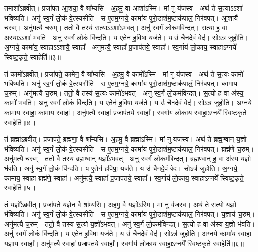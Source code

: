    तमाशा᳚ऽब्रवीत्।
   प्रजा॑पत आ॒शया॒ वै श्रा᳚म्यसि।
   अ॒हमु॒ वा आशा᳚ऽस्मि।
   मां नु य॑जस्व।
   अथ॑ ते स॒त्याऽऽशा॑ भविष्यति।
   अनु॑ स्व॒र्गं लो॒कं वे॒त्स्यसीति॑।
   स ए॒तम॒ग्नये॒ कामा॑य पुरो॒डाश॑म॒ष्टाक॑पालं॒ निर॑वपत्।
   आ॒शायै॑ च॒रुम्।
   अनु॑मत्यै च॒रुम्।
   ततो॒ वै तस्य॑ स॒त्याऽऽशा॑ऽभवत्।
   अनु॑ स्व॒र्गं लो॒कम॑विन्दत्।
   स॒त्या ह॒ वा अ॒स्याऽऽशा॑ भवति।
   अनु॑ स्व॒र्गं लो॒कं वि॑न्दति।
   य ए॒तेन॑ ह॒विषा॒ यज॑ते।
   य उ॑ चैनदे॒वं वेद॑।
   सोऽत्र॑ जुहोति।
   अ॒ग्नये॒ कामा॑य॒ स्वाहा॒ऽऽशायै॒ स्वाहा᳚।
   अनु॑मत्यै॒ स्वाहा᳚ प्र॒जाप॑तये॒ स्वाहा᳚।
   स्व॒र्गाय॑ लो॒काय॒ स्वाहा॒ऽग्नये᳚ स्विष्ट॒कृते॒ स्वाहेति॑॥३॥

   तं कामो᳚ऽब्रवीत्।
   प्रजा॑पते॒ कामे॑न॒ वै श्रा᳚म्यसि।
   अ॒हमु॒ वै कामो᳚ऽस्मि।
   मां नु य॑जस्व।
   अथ॑ ते स॒त्यः कामो॑ भविष्यति।
   अनु॑ स्व॒र्गं लो॒कं वे॒त्स्यसीति॑।
   स ए॒तम॒ग्नये॒ कामा॑य पुरो॒डाश॑म॒ष्टाक॑पालं॒ निर॑वपत्।
   कामा॑य च॒रुम्।
   अनु॑मत्यै च॒रुम्।
   ततो॒ वै तस्य॑ स॒त्यः कामो॑ऽभवत्।
   अनु॑ स्व॒र्गं लो॒कम॑विन्दत्।
   स॒त्यो ह॒ वा अ॑स्य॒ कामो॑ भवति।
   अनु॑ स्व॒र्गं लो॒कं वि॑न्दति।
   य ए॒तेन॑ ह॒विषा॒ यज॑ते।
   य उ॑ चैनदे॒वं वेद॑।
   सोऽत्र॑ जुहोति।
   अ॒ग्नये॒ कामा॑य॒ स्वाहा॒ कामा॑य॒ स्वाहा᳚।
   अनु॑मत्यै॒ स्वाहा᳚ प्र॒जाप॑तये॒ स्वाहा᳚।
   स्व॒र्गाय॑ लो॒काय॒ स्वाहा॒ऽग्नये᳚ स्विष्ट॒कृते॒ स्वाहेति॑॥४॥

   तं ब्रह्मा᳚ऽब्रवीत्।
   प्रजा॑पते॒ ब्रह्म॑णा॒ वै श्रा᳚म्यसि।
   अ॒हमु॒ वै ब्रह्मा᳚ऽस्मि।
   मां नु यज॑स्व।
   अथ॑ ते ब्रह्म॒ण्वान् य॒ज्ञो भ॑विष्यति।
   अनु॑ स्व॒र्गं लो॒कं वे॒त्स्यसीति॑।
   स ए॒तम॒ग्नये॒ कामा॑य पुरो॒डाश॑म॒ष्टाक॑पालं॒ निर॑वपत्।
   ब्रह्म॑णे च॒रुम्।
   अनु॑मत्यै च॒रुम्।
   ततो॒ वै तस्य॑ ब्रह्म॒ण्वान् य॒ज्ञो॑ऽभवत्।
   अनु॑ स्व॒र्गं लो॒कम॑विन्दत्।
   ब्र॒ह्म॒ण्वान् ह॒ वा अ॑स्य य॒ज्ञो भ॑वति।
   अनु॑ स्व॒र्गं लो॒कं वि॑न्दति।
   य ए॒तेन॑ ह॒विषा॒ यज॑ते।
   य उ॑ चैनदे॒वं वेद॑।
   सोऽत्र॑ जुहोति।
   अ॒ग्नये॒ कामा॑य॒ स्वाहा॒ ब्रह्म॑णे॒ स्वाहा᳚।
   अनु॑मत्यै॒ स्वाहा᳚ प्र॒जाप॑तये॒ स्वाहा᳚।
   स्व॒र्गाय॑ लो॒काय॒ स्वाहा॒ऽग्नये᳚ स्विष्ट॒कृते॒ स्वाहेति॑॥५॥

   तं य॒ज्ञो᳚ऽब्रवीत्।
   प्रजा॑पते य॒ज्ञेन॒ वै श्रा᳚म्यसि।
   अ॒हमु॒ वै य॒ज्ञो᳚ऽस्मि।
   मां नु य॑जस्व।
   अथ॑ ते स॒त्यो य॒ज्ञो भ॑विष्यति।
   अनु॑ स्व॒र्गं लो॒कं वे॒त्स्यसीति॑।
   स ए॒तम॒ग्नये॒ कामा॑य पुरो॒डाश॑म॒ष्टाक॑पालं॒ निर॑वपत्।
   य॒ज्ञाय॑ च॒रुम्।
   अनु॑मत्यै च॒रुम्।
   ततो॒ वै तस्य॑ स॒त्यो य॒ज्ञो॑ऽभवत्।
   अनु॑ स्व॒र्गं लो॒कम॑विन्दत्।
   स॒त्यो ह॒ वा अ॑स्य य॒ज्ञो भ॑वति।
   अनु॑ स्व॒र्गं लो॒कं वि॑न्दति।
   य ए॒तेन॑ ह॒विषा॒ यज॑ते।
   य उ॑ चैनदे॒वं वेद॑।
   सोऽत्र॑ जुहोति।
   अ॒ग्नये॒ कामा॑य॒ स्वाहा॑ य॒ज्ञाय॒ स्वाहा᳚।
   अनु॑मत्यै॒ स्वाहा᳚ प्र॒जाप॑तये॒ स्वाहा᳚।
   स्व॒र्गाय॑ लो॒काय॒ स्वाहा॒ऽग्नये᳚ स्विष्ट॒कृते॒ स्वाहेति॑॥६॥

